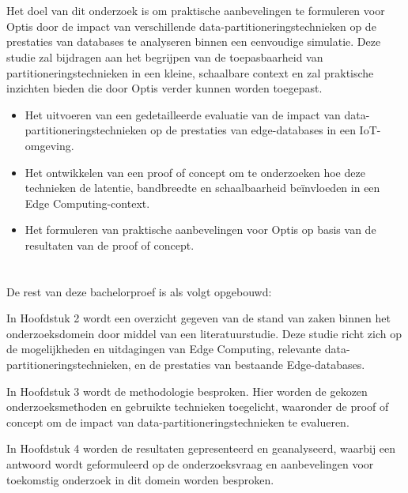 \section{}%
\label{sec:onderzoeksdoelstelling}

Het doel van dit onderzoek is om praktische aanbevelingen te formuleren voor Optis door de impact van verschillende data-partitioneringstechnieken op de prestaties van databases te analyseren binnen een eenvoudige simulatie. Deze studie zal bijdragen aan het begrijpen van de toepasbaarheid van partitioneringstechnieken in een kleine, schaalbare context en zal praktische inzichten bieden die door Optis verder kunnen worden toegepast.

\begin{itemize}
  \item Het uitvoeren van een gedetailleerde evaluatie van de impact van data-partitioneringstechnieken op de prestaties van edge-databases in een IoT-omgeving.
  \item Het ontwikkelen van een proof of concept om te onderzoeken hoe deze technieken de latentie, bandbreedte en schaalbaarheid beïnvloeden in een Edge Computing-context.
  \item Het formuleren van praktische aanbevelingen voor Optis op basis van de resultaten van de proof of concept.
\end{itemize}

\section{}%
\label{sec:opzet-bachelorproef}

De rest van deze bachelorproef is als volgt opgebouwd:

In Hoofdstuk 2 wordt een overzicht gegeven van de stand van zaken binnen het onderzoeksdomein door middel van een literatuurstudie. Deze studie richt zich op de mogelijkheden en uitdagingen van Edge Computing, relevante data-partitioneringstechnieken, en de prestaties van bestaande Edge-databases.

In Hoofdstuk 3 wordt de methodologie besproken. Hier worden de gekozen onderzoeksmethoden en gebruikte technieken toegelicht, waaronder de proof of concept om de impact van data-partitioneringstechnieken te evalueren.

In Hoofdstuk 4 worden de resultaten gepresenteerd en geanalyseerd, waarbij een antwoord wordt geformuleerd op de onderzoeksvraag en aanbevelingen voor toekomstig onderzoek in dit domein worden besproken.

